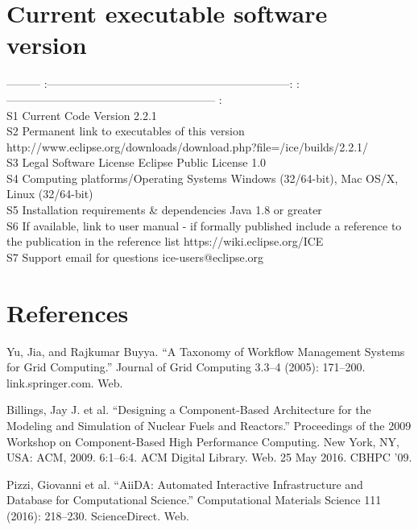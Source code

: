 \section*{Current executable software
version}\label{current-executable-software-version}

--------- \textbar{}
:-----------------------------------------------------------------:
\textbar{} :-------------------------------------------------------- :
\textbar{}\\S1 \textbar{} Current Code Version \textbar{} 2.2.1
\textbar{}\\S2 \textbar{} Permanent link to executables of this version
\textbar{}
http://www.eclipse.org/downloads/download.php?file=/ice/builds/2.2.1/
\textbar{}\\S3 \textbar{} Legal Software License \textbar{} Eclipse
Public License 1.0 \textbar{}\\S4 \textbar{} Computing
platforms/Operating Systems \textbar{} Windows (32/64-bit), Mac OS/X,
Linux (32/64-bit) \textbar{}\\S5 \textbar{} Installation requirements \&
dependencies \textbar{} Java 1.8 or greater \textbar{}\\S6 \textbar{} If
available, link to user manual - if formally published include a
reference to the publication in the reference list \textbar{}
https://wiki.eclipse.org/ICE \textbar{}\\S7 \textbar{} Support email for
questions \textbar{} ice-users@eclipse.org \textbar{}

\section{References}\label{references}

Yu, Jia, and Rajkumar Buyya. ``A Taxonomy of Workflow Management Systems
for Grid Computing.'' Journal of Grid Computing 3.3--4 (2005): 171--200.
link.springer.com. Web.

Billings, Jay J. et al. ``Designing a Component-Based Architecture for
the Modeling and Simulation of Nuclear Fuels and Reactors.'' Proceedings
of the 2009 Workshop on Component-Based High Performance Computing. New
York, NY, USA: ACM, 2009. 6:1--6:4. ACM Digital Library. Web. 25 May
2016. CBHPC '09.

Pizzi, Giovanni et al. ``AiiDA: Automated Interactive Infrastructure and
Database for Computational Science.'' Computational Materials Science
111 (2016): 218--230. ScienceDirect. Web.

